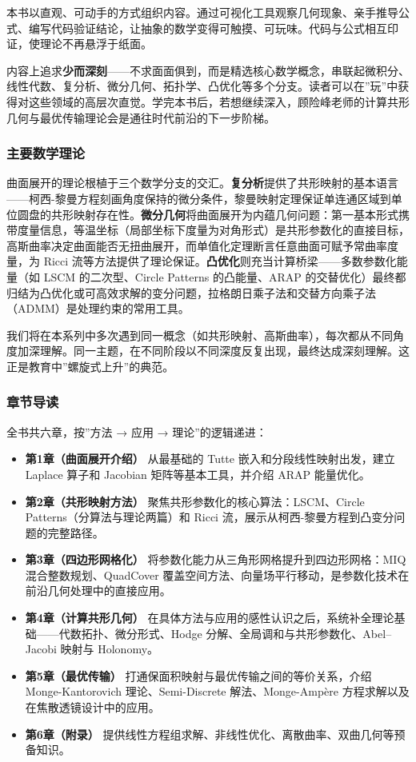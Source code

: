 \documentclass[
]{article}
\providecommand{\tightlist}{%
  \setlength{\itemsep}{0pt}\setlength{\parskip}{0pt}}
\begin{document}
本书以直观、可动手的方式组织内容。通过可视化工具观察几何现象、亲手推导公式、编写代码验证结论，让抽象的数学变得可触摸、可玩味。代码与公式相互印证，使理论不再悬浮于纸面。

内容上追求\textbf{少而深刻}------不求面面俱到，而是精选核心数学概念，串联起微积分、线性代数、复分析、微分几何、拓扑学、凸优化等多个分支。读者可以在''玩''中获得对这些领域的高层次直觉。学完本书后，若想继续深入，顾险峰老师的计算共形几何与最优传输理论会是通往时代前沿的下一步阶梯。

\subsubsection{主要数学理论}\label{ux4e3bux8981ux6570ux5b66ux7406ux8bba}

曲面展开的理论根植于三个数学分支的交汇。\textbf{复分析}提供了共形映射的基本语言------柯西-黎曼方程刻画角度保持的微分条件，黎曼映射定理保证单连通区域到单位圆盘的共形映射存在性。\textbf{微分几何}将曲面展开为内蕴几何问题：第一基本形式携带度量信息，等温坐标（局部坐标下度量为对角形式）是共形参数化的直接目标，高斯曲率决定曲面能否无扭曲展开，而单值化定理断言任意曲面可赋予常曲率度量，为
Ricci
流等方法提供了理论保证。\textbf{凸优化}则充当计算桥梁------多数参数化能量（如
LSCM 的二次型、Circle Patterns 的凸能量、ARAP
的交替优化）最终都归结为凸优化或可高效求解的变分问题，拉格朗日乘子法和交替方向乘子法（ADMM）是处理约束的常用工具。

我们将在本系列中多次遇到同一概念（如共形映射、高斯曲率），每次都从不同角度加深理解。同一主题，在不同阶段以不同深度反复出现，最终达成深刻理解。这正是教育中''螺旋式上升''的典范。

\subsubsection{章节导读}\label{ux7ae0ux8282ux5bfcux8bfb}

全书共六章，按''方法 → 应用 → 理论''的逻辑递进：

\begin{itemize}
\tightlist
\item
  \textbf{第1章（曲面展开介绍）} 从最基础的 Tutte
  嵌入和分段线性映射出发，建立 Laplace 算子和 Jacobian
  矩阵等基本工具，并介绍 ARAP 能量优化。
\item
  \textbf{第2章（共形映射方法）} 聚焦共形参数化的核心算法：LSCM、Circle
  Patterns（分算法与理论两篇）和 Ricci
  流，展示从柯西-黎曼方程到凸变分问题的完整路径。
\item
  \textbf{第3章（四边形网格化）}
  将参数化能力从三角形网格提升到四边形网格：MIQ 混合整数规划、QuadCover
  覆盖空间方法、向量场平行移动，是参数化技术在前沿几何处理中的直接应用。
\item
  \textbf{第4章（计算共形几何）}
  在具体方法与应用的感性认识之后，系统补全理论基础------代数拓扑、微分形式、Hodge
  分解、全局调和与共形参数化、Abel--Jacobi 映射与 Holonomy。
\item
  \textbf{第5章（最优传输）}
  打通保面积映射与最优传输之间的等价关系，介绍 Monge-Kantorovich
  理论、Semi-Discrete 解法、Monge-Ampère
  方程求解以及在焦散透镜设计中的应用。
\item
  \textbf{第6章（附录）}
  提供线性方程组求解、非线性优化、离散曲率、双曲几何等预备知识。
\end{itemize}
\end{document}
